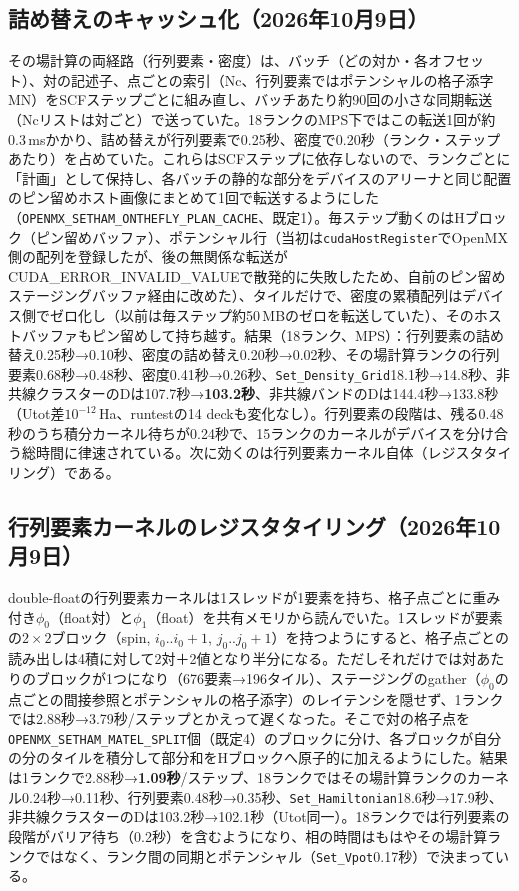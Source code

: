 \documentclass[a4paper,11pt]{ltjsarticle}
\newcommand{\code}[1]{\texttt{#1}}
\begin{document}
\subsection{詰め替えのキャッシュ化（2026年10月9日）}
その場計算の両経路（行列要素・密度）は、バッチ（どの対か・各オフセット）、対の記述子、点ごとの索引（Nc、行列要素ではポテンシャルの格子添字MN）をSCFステップごとに組み直し、バッチあたり約90回の小さな同期転送（Ncリストは対ごと）で送っていた。18ランクのMPS下ではこの転送1回が約0.3\,msかかり、詰め替えが行列要素で0.25秒、密度で0.20秒（ランク・ステップあたり）を占めていた。これらはSCFステップに依存しないので、ランクごとに「計画」として保持し、各バッチの静的な部分をデバイスのアリーナと同じ配置のピン留めホスト画像にまとめて1回で転送するようにした（\code{OPENMX\_SETHAM\_ONTHEFLY\_PLAN\_CACHE}、既定1）。毎ステップ動くのはHブロック（ピン留めバッファ）、ポテンシャル行（当初は\code{cudaHostRegister}でOpenMX側の配列を登録したが、後の無関係な転送がCUDA\_ERROR\_INVALID\_VALUEで散発的に失敗したため、自前のピン留めステージングバッファ経由に改めた）、タイルだけで、密度の累積配列はデバイス側でゼロ化し（以前は毎ステップ約50\,MBのゼロを転送していた）、そのホストバッファもピン留めして持ち越す。結果（18ランク、MPS）：行列要素の詰め替え0.25秒→0.10秒、密度の詰め替え0.20秒→0.02秒、その場計算ランクの行列要素0.68秒→0.48秒、密度0.41秒→0.26秒、\code{Set\_Density\_Grid}18.1秒→14.8秒、非共線クラスターのDは107.7秒→\textbf{103.2秒}、非共線バンドのDは144.4秒→133.8秒（Utot差$10^{-12}$\,Ha、runtestの14 deckも変化なし）。行列要素の段階は、残る0.48秒のうち積分カーネル待ちが0.24秒で、15ランクのカーネルがデバイスを分け合う総時間に律速されている。次に効くのは行列要素カーネル自体（レジスタタイリング）である。

\subsection{行列要素カーネルのレジスタタイリング（2026年10月9日）}
double-floatの行列要素カーネルは1スレッドが1要素を持ち、格子点ごとに重み付き$\phi_0$（float対）と$\phi_1$（float）を共有メモリから読んでいた。1スレッドが要素の$2\times2$ブロック（spin, $i_0..i_0{+}1$, $j_0..j_0{+}1$）を持つようにすると、格子点ごとの読み出しは4積に対して2対＋2値となり半分になる。ただしそれだけでは対あたりのブロックが1つになり（676要素→196タイル）、ステージングのgather（$\phi_0$の点ごとの間接参照とポテンシャルの格子添字）のレイテンシを隠せず、1ランクでは2.88秒→3.79秒/ステップとかえって遅くなった。そこで対の格子点を\code{OPENMX\_SETHAM\_MATEL\_SPLIT}個（既定4）のブロックに分け、各ブロックが自分の分のタイルを積分して部分和をHブロックへ原子的に加えるようにした。結果は1ランクで2.88秒→\textbf{1.09秒}/ステップ、18ランクではその場計算ランクのカーネル0.24秒→0.11秒、行列要素0.48秒→0.35秒、\code{Set\_Hamiltonian}18.6秒→17.9秒、非共線クラスターのDは103.2秒→102.1秒（Utot同一）。18ランクでは行列要素の段階がバリア待ち（0.2秒）を含むようになり、相の時間はもはやその場計算ランクではなく、ランク間の同期とポテンシャル（\code{Set\_Vpot}0.17秒）で決まっている。
\end{document}

